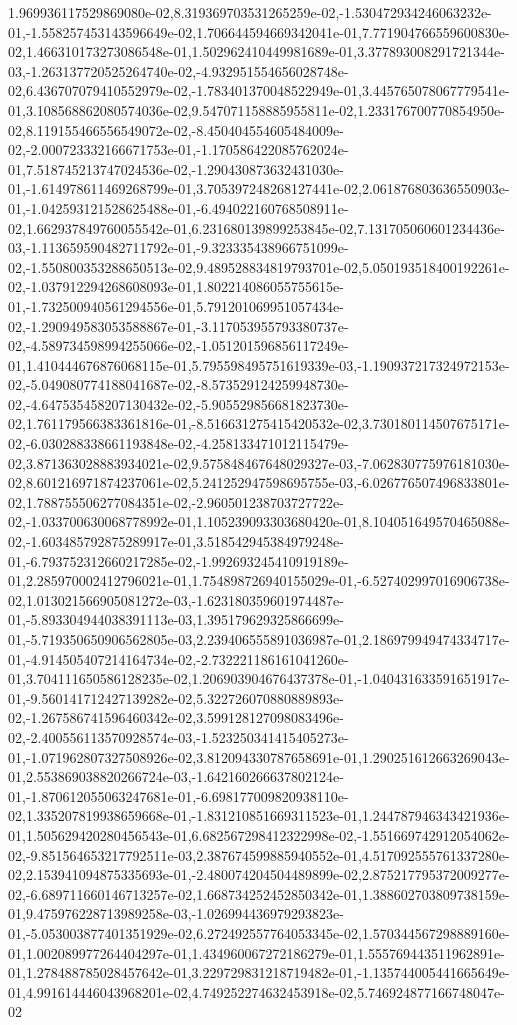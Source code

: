 1.969936117529869080e-02,8.319369703531265259e-02,-1.530472934246063232e-01,-1.558257453143596649e-02,1.706644594669342041e-01,7.771904766559600830e-02,1.466310173273086548e-01,1.502962410449981689e-01,3.377893008291721344e-03,-1.263137720525264740e-02,-4.932951554656028748e-02,6.436707079410552979e-02,-1.783401370048522949e-01,3.445765078067779541e-01,3.108568862080574036e-02,9.547071158885955811e-02,1.233176700770854950e-02,8.119155466556549072e-02,-8.450404554605484009e-02,-2.000723332166671753e-01,-1.170586422085762024e-01,7.518745213747024536e-02,-1.290430873632431030e-01,-1.614978611469268799e-01,3.705397248268127441e-02,2.061876803636550903e-01,-1.042593121528625488e-01,-6.494022160768508911e-02,1.662937849760055542e-01,6.231680139899253845e-02,7.131705060601234436e-03,-1.113659590482711792e-01,-9.323335438966751099e-02,-1.550800353288650513e-02,9.489528834819793701e-02,5.050193518400192261e-02,-1.037912294268608093e-01,1.802214086055755615e-01,-1.732500940561294556e-01,5.791201069951057434e-02,-1.290949583053588867e-01,-3.117053955793380737e-02,-4.589734598994255066e-02,-1.051201596856117249e-01,1.410444676876068115e-01,5.795598495751619339e-03,-1.190937217324972153e-02,-5.049080774188041687e-02,-8.573529124259948730e-02,-4.647535458207130432e-02,-5.905529856681823730e-02,1.761179566383361816e-01,-8.516631275415420532e-02,3.730180114507675171e-02,-6.030288338661193848e-02,-4.258133471012115479e-02,3.871363028883934021e-02,9.575848467648029327e-03,-7.062830775976181030e-02,8.601216971874237061e-02,5.241252947598695755e-03,-6.026776507496833801e-02,1.788755506277084351e-02,-2.960501238703727722e-02,-1.033700630068778992e-01,1.105239093303680420e-01,8.104051649570465088e-02,-1.603485792875289917e-01,3.518542945384979248e-01,-6.793752312660217285e-02,-1.992693245410919189e-01,2.285970002412796021e-01,1.754898726940155029e-01,-6.527402997016906738e-02,1.013021566905081272e-03,-1.623180359601974487e-01,-5.893304944038391113e-03,1.395179629325866699e-01,-5.719350650906562805e-03,2.239406555891036987e-01,2.186979949474334717e-01,-4.914505407214164734e-02,-2.732221186161041260e-01,3.704111650586128235e-02,1.206903904676437378e-01,-1.040431633591651917e-01,-9.560141712427139282e-02,5.322726070880889893e-02,-1.267586741596460342e-02,3.599128127098083496e-02,-2.400556113570928574e-03,-1.523250341415405273e-01,-1.071962807327508926e-02,3.812094330787658691e-01,1.290251612663269043e-01,2.553869038820266724e-03,-1.642160266637802124e-01,-1.870612055063247681e-01,-6.698177009820938110e-02,1.335207819938659668e-01,-1.831210851669311523e-01,1.244787946343421936e-01,1.505629420280456543e-01,6.682567298412322998e-02,-1.551669742912054062e-02,-9.851564653217792511e-03,2.387674599885940552e-01,4.517092555761337280e-02,2.153941094875335693e-01,-2.480074204504489899e-02,2.875217795372009277e-02,-6.689711660146713257e-02,1.668734252452850342e-01,1.388602703809738159e-01,9.475976228713989258e-03,-1.026994436979293823e-01,-5.053003877401351929e-02,6.272492557764053345e-02,1.570344567298889160e-01,1.002089977264404297e-01,1.434960067272186279e-01,1.555769443511962891e-01,1.278488785028457642e-01,3.229729831218719482e-01,-1.135744005441665649e-01,4.991614446043968201e-02,4.749252274632453918e-02,5.746924877166748047e-02
